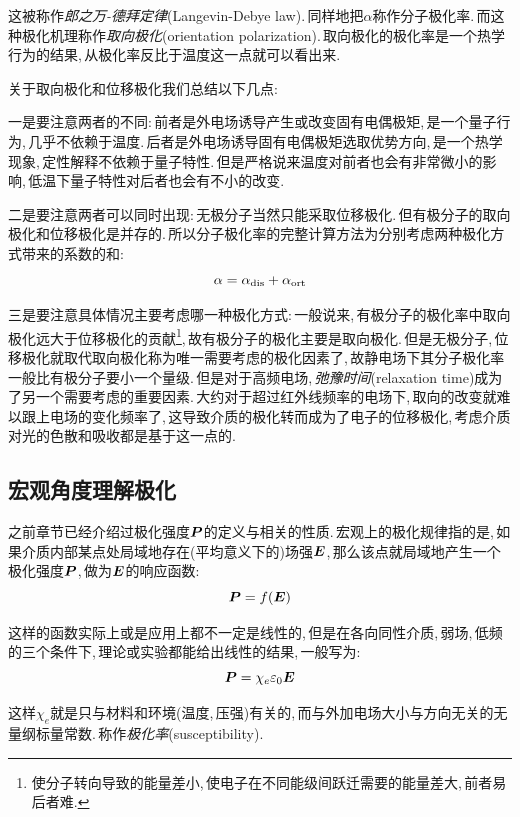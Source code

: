 这被称作\emph{郎之万-德拜定律}(Langevin-Debye law).\,同样地把$\alpha$称作分子极化率.\,而这种极化机理称作\emph{取向极化}(orientation polarization).\,取向极化的极化率是一个热学行为的结果,\,从极化率反比于温度这一点就可以看出来.

\vspace{1.5cm}

关于取向极化和位移极化我们总结以下几点:

一是要注意两者的不同:\,前者是外电场诱导产生或改变固有电偶极矩,\,是一个量子行为,\,几乎不依赖于温度.\,后者是外电场诱导固有电偶极矩选取优势方向,\,是一个热学现象,\,定性解释不依赖于量子特性.\,但是严格说来温度对前者也会有非常微小的影响,\,低温下量子特性对后者也会有不小的改变.

二是要注意两者可以同时出现:\,无极分子当然只能采取位移极化.\,但有极分子的取向极化和位移极化是并存的.\,所以分子极化率的完整计算方法为分别考虑两种极化方式带来的系数的和:
\[\alpha=\alpha_{\rm dis}+\alpha_{\rm ort}\]

三是要注意具体情况主要考虑哪一种极化方式:\,一般说来,\,有极分子的极化率中取向极化远大于位移极化的贡献\footnote{使分子转向导致的能量差小,\,使电子在不同能级间跃迁需要的能量差大,\,前者易后者难.},\,故有极分子的极化主要是取向极化.\,但是无极分子,\,位移极化就取代取向极化称为唯一需要考虑的极化因素了,\,故静电场下其分子极化率一般比有极分子要小一个量级.\,但是对于高频电场,\,\emph{弛豫时间}(relaxation time)成为了另一个需要考虑的重要因素.\,大约对于超过红外线频率的电场下,\,取向的改变就难以跟上电场的变化频率了,\,这导致介质的极化转而成为了电子的位移极化,\,考虑介质对光的色散和吸收都是基于这一点的.

\subsection{宏观角度理解极化}

之前章节已经介绍过极化强度$\boldsymbol{P}$的定义与相关的性质.\,宏观上的极化规律指的是,\,如果介质内部某点处局域地存在(平均意义下的)场强$\boldsymbol{E}$,\,那么该点就局域地产生一个极化强度$\boldsymbol{P}$,\,做为$\boldsymbol{E}$的响应函数:
\[\boldsymbol{P}=f(\boldsymbol{E})\]

这样的函数实际上或是应用上都不一定是线性的,\,但是在各向同性介质,\,弱场,\,低频的三个条件下,\,理论或实验都能给出线性的结果,\,一般写为:
\[\boldsymbol{P}=\chi_e \varepsilon_0 \boldsymbol{E}\]

这样$\chi_e$就是只与材料和环境(温度,\,压强)有关的,\,而与外加电场大小与方向无关的无量纲标量常数.\,称作\emph{极化率}(susceptibility).

